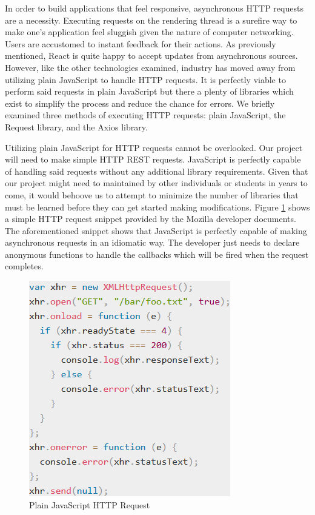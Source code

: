 \documentclass[12pt]{report}
\begin{document}
In order to build applications that feel responsive, asynchronous HTTP requests are a necessity. Executing requests on the rendering thread is a surefire way to make one's application feel sluggish given the nature of computer networking. Users are accustomed to instant feedback for their actions. As previously mentioned, React is quite happy to accept updates from asynchronous sources. However, like the other technologies examined, industry has moved away from utilizing plain JavaScript to handle HTTP requests. It is perfectly viable to perform said requests in plain JavaScript but there a plenty of libraries which exist to simplify the process and reduce the chance for errors. We briefly examined three methods of executing HTTP requests: plain JavaScript, the Request library, and the Axios library.

Utilizing plain JavaScript for HTTP requests cannot be overlooked. Our project will need to make simple HTTP REST requests. JavaScript is perfectly capable of handling said requests without any additional library requirements. Given that our project might need to maintained by other individuals or students in years to come, it would behoove us to attempt to minimize the number of libraries that must be learned before they can get started making modifications. Figure \ref{fig:javascripthttprequest} shows a simple HTTP request snippet provided by the Mozilla developer documents.\cite{mozillahttprequest} The aforementioned snippet shows that JavaScript is perfectly capable of making asynchronous requests in an idiomatic way. The developer just needs to declare anonymous functions to handle the callbacks which will be fired when the request completes.

\begin{figure}[h]
	\centering
	\includegraphics[scale=0.5]{javascript_http_request}
	\caption{Plain JavaScript HTTP Request}
	\label{fig:javascripthttprequest}
\end{figure}
\end{document}
